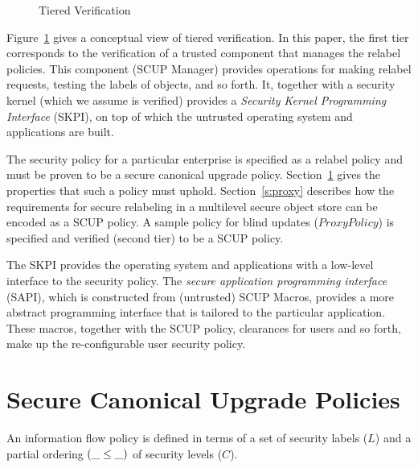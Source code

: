 \begin{figure}[htb]
\begin{center}
\mbox{}
\end{center}
\caption{Tiered Verification\label{f:tier}}
\end{figure}

Figure~\ref{f:tier} gives a conceptual view of tiered verification.  In
this paper, the first tier corresponds to the verification of a trusted
component that manages the relabel policies. This component 
(SCUP Manager) provides
operations for making relabel requests, testing the labels of objects, 
and so forth. It, together with a security kernel (which we assume is 
verified) provides a {\it Security Kernel Programming Interface\/}
(SKPI), on top of which the untrusted operating system and applications 
are built. 

The security policy for a particular enterprise is specified as a
relabel policy and must be proven to be a secure canonical upgrade
policy.  Section~\ref{s:scup}  gives the properties that such
a policy must uphold.  Section~\ref{s:proxy} describes how the 
requirements for secure relabeling in a multilevel secure object store 
can be encoded as a SCUP policy. A sample policy for blind updates
($ProxyPolicy$) is specified and verified (second tier) to be a SCUP
policy.  

The SKPI provides the operating system and applications with a
low-level interface to the security policy. The {\it secure application
programming interface\/} (SAPI), which is constructed from (untrusted)
SCUP Macros, provides a more abstract programming
interface that is tailored to the particular application.
These macros, together with the SCUP policy, clearances for
users and so forth,  make up the re-configurable user security policy. 


\section{Secure Canonical Upgrade Policies} \label{s:scup}

An information flow policy is defined in terms of a set 
of security labels ($L$) and a partial ordering $(\_\leq\_)$ of 
security levels ($C$). 

